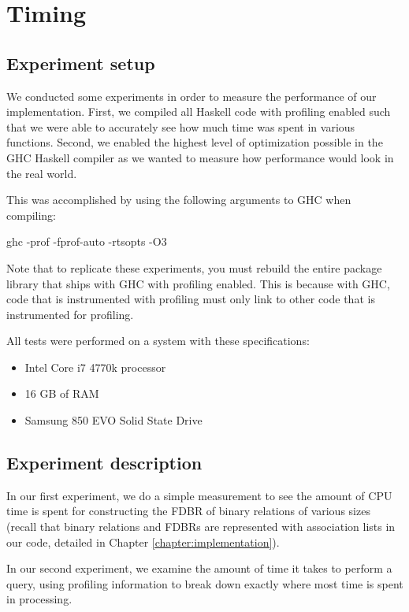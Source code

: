 \documentclass[../main.tex]{subfiles}
\begin{document}
\chapter{Timing}
\label{chapter:timing}

\section{Experiment setup}

We conducted some experiments in order to measure the performance of our implementation.
First, we compiled all Haskell code with profiling enabled such that we were able to accurately see how much time was spent in various functions.
Second, we enabled the highest level of optimization possible in the GHC Haskell compiler as we wanted to measure how performance would look in the real world.

This was accomplished by using the following arguments to GHC when compiling:

\begin{code}
	ghc -prof -fprof-auto -rtsopts -O3
\end{code}

Note that to replicate these experiments, you must rebuild the entire package library that ships with GHC with profiling enabled.
This is because with GHC, code that is instrumented with profiling must only link to other code that is instrumented for profiling.

All tests were performed on a system with these specifications:

\begin{itemize}
	\item Intel Core i7 4770k processor
	\item 16 GB of RAM
	\item Samsung 850 EVO Solid State Drive
\end{itemize}


\section{Experiment description}

In our first experiment, we do a simple measurement to see the amount of CPU time is spent for constructing the FDBR of
binary relations of various sizes (recall that binary relations and FDBRs are represented with association lists in our code, detailed in Chapter \ref{chapter:implementation}).  

In our second experiment, we examine the amount of time it takes to perform a query, using profiling information to break down
exactly where most time is spent in processing.
\end{document}
